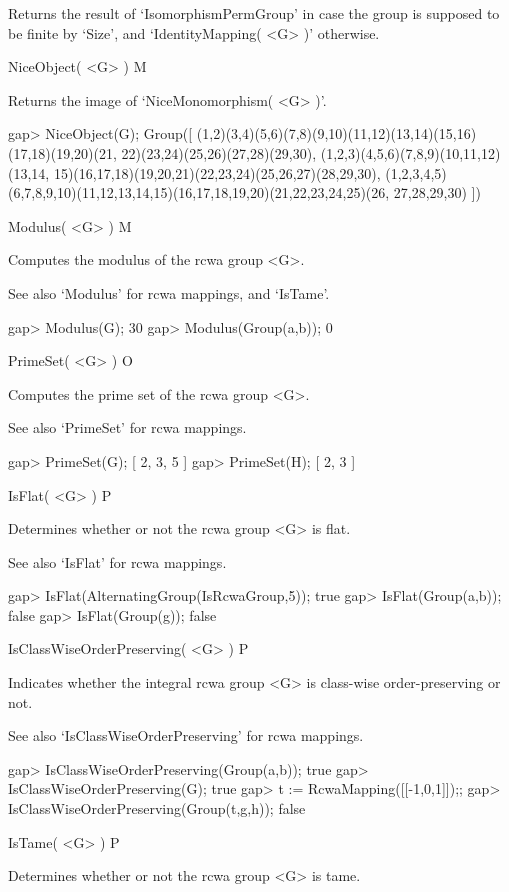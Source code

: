Returns the result of `IsomorphismPermGroup' in case the group is
supposed to be finite by `Size', and `IdentityMapping( <G> )' otherwise.

\>NiceObject( <G> ) M

Returns the image of `NiceMonomorphism( <G> )'.

\beginexample
gap> NiceObject(G);
Group([ (1,2)(3,4)(5,6)(7,8)(9,10)(11,12)(13,14)(15,16)(17,18)(19,20)(21,
    22)(23,24)(25,26)(27,28)(29,30), (1,2,3)(4,5,6)(7,8,9)(10,11,12)(13,14,
    15)(16,17,18)(19,20,21)(22,23,24)(25,26,27)(28,29,30),
  (1,2,3,4,5)(6,7,8,9,10)(11,12,13,14,15)(16,17,18,19,20)(21,22,23,24,25)(26,
    27,28,29,30) ])                                                             
\endexample

\>Modulus( <G> ) M

Computes the modulus of the rcwa group <G>.

See also `Modulus' for rcwa mappings, and `IsTame'.

\beginexample
gap> Modulus(G);
30
gap> Modulus(Group(a,b));
0
\endexample

\>PrimeSet( <G> ) O

Computes the prime set of the rcwa group <G>.

See also `PrimeSet' for rcwa mappings.

\beginexample
gap> PrimeSet(G);
[ 2, 3, 5 ]
gap> PrimeSet(H);
[ 2, 3 ]
\endexample

\>IsFlat( <G> ) P

Determines whether or not the rcwa group <G> is flat.

See also `IsFlat' for rcwa mappings.

\beginexample
gap> IsFlat(AlternatingGroup(IsRcwaGroup,5));
true
gap> IsFlat(Group(a,b));
false
gap> IsFlat(Group(g));
false
\endexample

\>IsClassWiseOrderPreserving( <G> ) P

Indicates whether the integral rcwa group <G> is class-wise
order-preserving or not.

See also `IsClassWiseOrderPreserving' for rcwa mappings.

\beginexample
gap> IsClassWiseOrderPreserving(Group(a,b));
true
gap> IsClassWiseOrderPreserving(G);
true
gap> t := RcwaMapping([[-1,0,1]]);;
gap> IsClassWiseOrderPreserving(Group(t,g,h));
false
\endexample

\>IsTame( <G> ) P

Determines whether or not the rcwa group <G> is tame.

